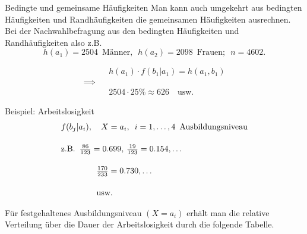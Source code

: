 \documentclass[
  10pt,
  ignorenonframetext,
]{beamer}
\begin{document}
\begin{frame}{Bedingte und gemeinsame Häufigkeiten}
\protect\hypertarget{bedingte-und-gemeinsame-huxe4ufigkeiten}{}
Man kann auch umgekehrt aus bedingten Häufigkeiten und Randhäufigkeiten
die gemeinsamen Häufigkeiten ausrechnen.\\
Bei der Nachwahlbefragung aus den bedingten Häufigkeiten und
Randhäufigkeiten also z.B. \[
h(a_1) = 2504\,\,\, \mbox{Männer},\,\,\, h(a_2) = 2098 \,\,\,\mbox{Frauen}; \,\,\,n = 4602.
\]

\[
\begin{array}{lcl}
& & h(a_1)\cdot f(b_1|a_1) = h(a_1,b_1)\\
\implies & &\\
& & 2504\cdot 25\% \approx 626 \quad\mbox{usw.}
\end{array}
\]
\end{frame}

\begin{frame}{Beispiel: Arbeitslosigkeit}
\protect\hypertarget{beispiel-arbeitslosigkeit-1}{}
\begin{displaymath}
  \begin{array}{l}
      f(b_j|a_i), \quad X = a_i, \,\,\,i=1,\ldots,4 \,\,\,\mbox{Ausbildungsniveau}
      \\*[0.5cm] \mbox{z.B.}\,\,\, \frac{86}{123} = 0.699, \,\frac{19}{123} = 0.154,\ldots
      \\*[0.5cm] \hspace*{1.5cm}\frac{170}{233} = 0.730,\ldots
      \\*[0.5cm] \hspace*{1.5cm} \mbox{usw.}
  \end{array}
\end{displaymath}

\vspace*{1cm}

Für festgehaltenes Ausbildungsniveau \((X=a_i)\) erhält man die relative
Verteilung über die Dauer der Arbeitslosigkeit durch die folgende
Tabelle.
\end{frame}
\end{document}

